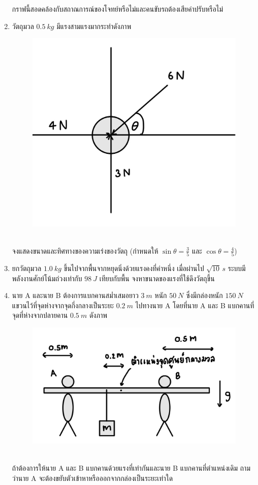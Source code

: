 \documentclass[a4paper,12pt]{article}
\begin{document}
\begin{enumerate}
		กราฟนี้สอดคล้องกับสถาณการณ์ของโจทย์หรือไม่และคนขับรถต้องเสียค่าปรับหรือไม่
			\vspace{4cm}
		
		\item วัตถุมวล \(\SI{0.5}{kg}\) มีแรงสามแรงมากระทำดังภาพ
		\begin{figure}[h]
			\centering
			\includegraphics[width=0.3\linewidth]{3}
		\end{figure}\\
		จงแสดงขนาดและทิศทางของความเร่งของวัตถุ (กำหนดให้ \(\sin\theta=\frac{3}{5}\) และ \(\cos\theta=\frac{4}{5}\))
			\vspace{4cm}
		
		\item ยกวัตถุมวล \(\SI{1.0}{kg}\) ขึ้นไปจากพื้นจากหยุดนิ่งด้วยแรงคงที่ค่าหนึ่ง เมื่อผ่านไป \(\sqrt{10}\,\si{s}\) ระบบมีพลังงานศักย์โน้มถ่วงเท่ากับ \(\SI{98}{J}\) เทียบกับพื้น จงหาขนาดของแรงที่ใช้ดึงวัตถุขึ้น
			\vspace{4cm}
		
		\item นาย A และนาย B ต้องการแบกคานสม่ำเสมอยาว \(\SI{3}{m}\) หนัก \(\SI{50}{N}\) ซึ่งมีกล่องหนัก \(\SI{150}{N}\) แขวนไว้ที่จุดห่างจากจุดกึ่งกลางเป็นระยะ \(\SI{0.2}{m}\) ไปทางนาย A โดยที่นาย A และ B แบกคานที่จุดที่ห่างจากปลายคาน \(\SI{0.5}{m}\) ดังภาพ
		\begin{figure}[h]
			\centering
			\includegraphics[width=0.5\linewidth]{5}
		\end{figure}\\
		ถ้าต้องการให้นาย A และ B แบกคานด้วยแรงที่เท่ากันและนาย B แบกคานที่ตำแหน่งเดิม ถามว่านาย A จะต้องขยับตัวเข้าหาหรือออกจากกล่องเป็นระยะเท่าใด
			\vspace{4cm}
		

\end{enumerate}
\end{document}
